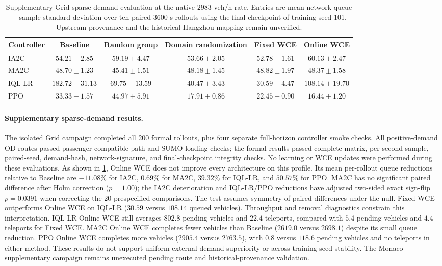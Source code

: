 \begin{table}[t]
\centering
\caption{Supplementary Grid sparse-demand evaluation at the native $2983$ veh/h rate. Entries are mean network queue $\pm$ sample standard deviation over ten paired 3600-s rollouts using the final checkpoint of training seed 101. Upstream provenance and the historical Hangzhou mapping remain unverified.}
\label{tab:external_grid_sparse}
\begin{tabular}{lccccc}
\toprule
Controller & Baseline & Random group & Domain randomization & Fixed WCE & Online WCE \\
\midrule
IA2C & $54.21 \pm 2.85$ & $59.19 \pm 4.47$ & $53.66 \pm 2.05$ & $52.78 \pm 1.61$ & $60.13 \pm 2.47$ \\
MA2C & $48.70 \pm 1.23$ & $45.41 \pm 1.51$ & $48.18 \pm 1.45$ & $48.82 \pm 1.97$ & $48.37 \pm 1.58$ \\
IQL-LR & $182.72 \pm 31.13$ & $69.75 \pm 13.59$ & $40.47 \pm 3.43$ & $30.59 \pm 4.47$ & $108.14 \pm 19.70$ \\
PPO & $33.33 \pm 1.57$ & $44.97 \pm 5.91$ & $17.91 \pm 0.86$ & $22.45 \pm 0.90$ & $16.44 \pm 1.20$ \\
\bottomrule
\end{tabular}
\end{table}

\paragraph{Supplementary sparse-demand results.}
The isolated Grid campaign completed all 200 formal rollouts, plus four separate full-horizon controller smoke checks. All positive-demand OD routes passed passenger-compatible path and SUMO loading checks; the formal results passed complete-matrix, per-second sample, paired-seed, demand-hash, network-signature, and final-checkpoint integrity checks. No learning or WCE updates were performed during these evaluations.
As shown in \cref{tab:external_grid_sparse}, Online WCE does not improve every architecture on this profile. Its mean per-rollout queue reductions relative to Baseline are $-11.08\%$ for IA2C, $0.69\%$ for MA2C, $39.32\%$ for IQL-LR, and $50.57\%$ for PPO. MA2C has no significant paired difference after Holm correction ($p=1.00$); the IA2C deterioration and IQL-LR/PPO reductions have adjusted two-sided exact sign-flip $p=0.0391$ when correcting the 20 prespecified comparisons. The test assumes symmetry of paired differences under the null. Fixed WCE outperforms Online WCE on IQL-LR ($30.59$ versus $108.14$ queued vehicles).
Throughput and removal diagnostics constrain this interpretation. IQL-LR Online WCE still averages $802.8$ pending vehicles and $22.4$ teleports, compared with $5.4$ pending vehicles and $4.4$ teleports for Fixed WCE. MA2C Online WCE completes fewer vehicles than Baseline ($2619.0$ versus $2698.1$) despite its small queue reduction. PPO Online WCE completes more vehicles ($2905.4$ versus $2763.5$), with $0.8$ versus $118.6$ pending vehicles and no teleports in either method. These results do not support uniform external-demand superiority or across-training-seed stability. The Monaco supplementary campaign remains unexecuted pending route and historical-provenance validation.
